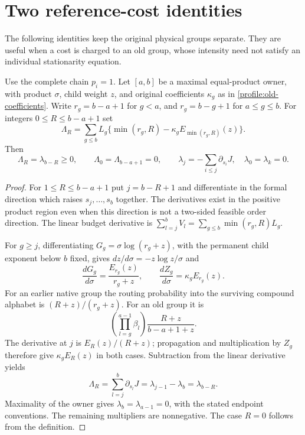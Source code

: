 \section{Two reference-cost identities}\label{app:geometry}

The following identities keep the original physical groups separate.
They are useful when a cost is charged to an old group, whose intensity
need not satisfy an individual stationarity equation.

\begin{lemma}\label{geometry:clipped-margin}
Use the complete chain $p_i=1$. Let $[a,b]$ be a maximal equal-product
owner, with product $\sigma$, child weight $z$, and original coefficients
$\kappa_g$ as in \eqref{profile:old-coefficients}. Write $r_g=b-a+1$ for
$g<a$, and $r_g=b-g+1$ for $a\le g\le b$. For integers
$0\le R\le b-a+1$ set
\[
 \Lambda_R=\sum_{g\le b}L_g\{
 \min(r_g,R)-\kappa_g E_{\min(r_g,R)}(z)\}.
\]
Then
\[
 \Lambda_R=\lambda_{b-R}\ge0,\qquad
 \Lambda_0=\Lambda_{b-a+1}=0,
 \qquad
 \lambda_j=-\sum_{i\le j}\partial_{s_i}J,
 \quad\lambda_0=\lambda_k=0.
\]
\end{lemma}
\begin{proof}
For $1\le R\le b-a+1$ put $j=b-R+1$ and differentiate in the
formal direction which raises $s_j,\ldots,s_b$ together. The derivatives
exist in the positive product region even when this direction is not
a two-sided feasible order direction. The linear budget derivative is
$\sum_{l=j}^bV_l=\sum_{g\le b}\min(r_g,R)L_g$.

For $g\ge j$, differentiating $G_g=\sigma\log(r_g+z)$, with the
permanent child exponent below $b$ fixed, gives
$dz/d\sigma=-z\log z/\sigma$ and
\[
 \frac{dG_g}{d\sigma}=\frac{E_{r_g}(z)}{r_g+z},
 \qquad \frac{dZ_g}{d\sigma}=\kappa_gE_{r_g}(z).
\]
For an earlier native group the routing probability into the surviving
compound alphabet is $(R+z)/(r_g+z)$. For an old group it is
\[
 \left(\prod_{l=g}^{a-1}\beta_l\right)
       \frac{R+z}{b-a+1+z}.
\]
The derivative at $j$ is $E_R(z)/(R+z)$; propagation and multiplication
by $Z_g$ therefore give $\kappa_gE_R(z)$ in both cases. Subtraction
from the linear derivative yields
\[
 \Lambda_R=\sum_{l=j}^b\partial_{s_l}J
            =\lambda_{j-1}-\lambda_b=\lambda_{b-R}.
\]
Maximality of the owner gives $\lambda_b=\lambda_{a-1}=0$, with the
stated endpoint conventions. The remaining multipliers are nonnegative.
The case $R=0$ follows from the definition.
\end{proof}

